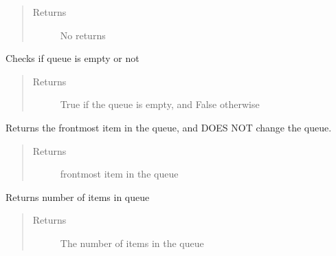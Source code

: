 \documentclass[letterpaper,10pt,english]{sphinxmanual}
\begin{document}
\begin{fulllineitems}
\begin{fulllineitems}
\begin{quote}
\begin{description}
\item[{Returns}] \leavevmode
\sphinxAtStartPar
No returns

\end{description}\end{quote}

\end{fulllineitems}


\begin{fulllineitems}
\label{\detokenize{index:droogCNC.Queue.is_empty}}
\sphinxAtStartPar
Checks if queue is empty or not
\begin{quote}\begin{description}
\item[{Returns}] \leavevmode
\sphinxAtStartPar
True if the queue is empty, and False otherwise

\end{description}\end{quote}

\end{fulllineitems}


\begin{fulllineitems}
\label{\detokenize{index:droogCNC.Queue.peek}}
\sphinxAtStartPar
Returns the front\sphinxhyphen{}most item in the queue, and DOES NOT change the queue.
\begin{quote}\begin{description}
\item[{Returns}] \leavevmode
\sphinxAtStartPar
front\sphinxhyphen{}most item in the queue

\end{description}\end{quote}

\end{fulllineitems}


\begin{fulllineitems}
\label{\detokenize{index:droogCNC.Queue.size}}
\sphinxAtStartPar
Returns number of items in queue
\begin{quote}\begin{description}
\item[{Returns}] \leavevmode
\sphinxAtStartPar
The number of items in the queue

\end{description}\end{quote}

\end{fulllineitems}


\end{fulllineitems}
\end{document}
